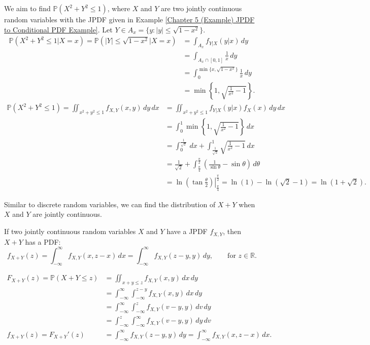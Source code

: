 \documentclass{huhtakm-template-book-v2}
\newcommand{\prob}{\mathbb{P}}
\begin{document}
    \begin{eg}
        We aim to find $\prob(X^{2}+Y^{2} \leq 1)$, where $X$ and $Y$ are two jointly continuous random variables with the JPDF given in Example \ref{Chapter 5 (Example) JPDF to Conditional PDF Example}. Let $Y \in A_{x} = \{y:|y| \leq \sqrt{1-x^{2}}\}$.
        \begin{align*}
            \prob(X^{2}+Y^{2} \leq 1|X = x) = \prob(|Y| \leq \sqrt{1-x^{2}}|X = x) &= \int_{A_{x}}f_{Y|X}(y|x)\,dy\\
            &= \int_{A_{x}\cap[0,1]}\frac{1}{x}\,dy\\
            &= \int_{0}^{\min\{x,\sqrt{1-x^{2}}\}}\frac{1}{x}\,dy\\
            &= \min\left\{1,\sqrt{\frac{1}{x^{2}}-1}\right\}.
        \end{align*}
        \begin{align*}
            \prob(X^{2}+Y^{2} \leq 1) = \iint_{x^{2}+y^{2} \leq 1}f_{X,Y}(x, y)\,dy\,dx &= \iint_{x^{2}+y^{2} \leq 1}f_{Y|X}(y|x)f_{X}(x)\,dy\,dx\\
            &= \int_{0}^{1}\min\left\{1,\sqrt{\frac{1}{x^{2}}-1}\right\}\,dx\\
            &= \int_{0}^{\frac{1}{\sqrt{2}}}\,dx+\int_{\frac{1}{\sqrt{2}}}^{1}\sqrt{\frac{1}{x^{2}}-1}\,dx\\
            \tag{$x = \sin\theta$}
            &= \frac{1}{\sqrt{2}}+\int_{\frac{\pi}{4}}^{\frac{\pi}{2}}\left(\frac{1}{\sin\theta}-\sin\theta\right)\,d\theta\\
            &= \left.\ln\left(\tan\frac{\theta}{2}\right)\right|_{\frac{\pi}{4}}^{\frac{\pi}{2}} = \ln(1)-\ln(\sqrt{2}-1) = \ln(1+\sqrt{2}).
        \end{align*}
    \end{eg}
    Similar to discrete random variables, we can find the distribution of $X+Y$ when $X$ and $Y$ are jointly continuous.
    \begin{thm}
        If two jointly continuous random variables $X$ and $Y$ have a JPDF $f_{X,Y}$, then $X+Y$ has a PDF:
        \begin{equation*}
            f_{X+Y}(z) = \int_{-\infty}^{\infty} f_{X,Y}(x,z-x)\,dx = \int_{-\infty}^{\infty} f_{X,Y}(z-y,y)\,dy, \qquad\text{for }z \in \mathbb{R}.
        \end{equation*}
    \end{thm}
    \begin{proofing}
        \begin{align*}
            F_{X+Y}(z) = \prob(X+Y \leq z) &= \iint_{x+y \leq z}f_{X,Y}(x, y)\,dx\,dy\\
            &= \int_{-\infty}^{\infty}\int_{-\infty}^{z-y} f_{X,Y}(x, y)\,dx\,dy\\
            \tag{$v = x+y$}
            &= \int_{-\infty}^{\infty}\int_{-\infty}^{z} f_{X,Y}(v-y,y)\,dv\,dy\\
            &= \int_{-\infty}^{z}\int_{-\infty}^{\infty} f_{X,Y}(v-y,y)\,dy\,dv\\
            f_{X+Y}(z) = F_{X+Y}'(z) &= \int_{-\infty}^{\infty} f_{X,Y}(z-y,y)\,dy = \int_{-\infty}^{\infty} f_{X,Y}(x,z-x)\,dx.
        \end{align*}
    \end{proofing}
\end{document}
